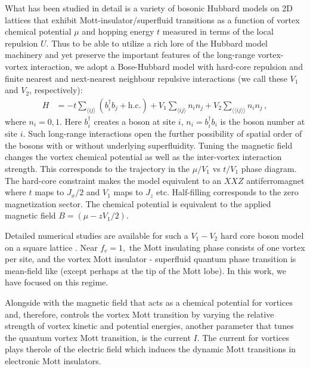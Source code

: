 \documentclass[aps,twocolumn,prl,10pt,amsmath,amssymb,nofootinbib,showpacs,superscriptaddress,floatfix]{revtex4-1}
\begin{document}
What has been studied in detail is a variety of bosonic Hubbard models on 2D lattices that exhibit Mott-insulator/superfluid
transitions as a function of vortex chemical potential $\mu$ and
hopping energy $t$ measured in terms of the local repulsion $U$.
Thus to be able to utilize a rich lore of the Hubbard model machinery and yet preserve the important features of the long-range vortex-vortex interaction, we adopt
a Bose-Hubbard model with hard-core repulsion
and finite nearest and next-nearest neighbour repulsive interactions
(we call these $V_{1}$ and $V_{2}$, respectively): 
\begin{align}
	H & =-t\sum_{\langle ij\rangle}(b_{i}^{\dagger}b_{j}+\text{h.c.})+V_{1}\sum_{\langle ij\rangle}n_{i}n_{j}+V_{2}\sum_{\langle\langle ij\rangle\rangle}n_{i}n_{j}\,, %
	\label{eq:model-hardcore}
\end{align}
where $n_{i}=0,1$.
Here $b_{i}^{\dagger}$ creates a boson at site $i$, $n_{i}=b_{i}^{\dagger}b_{i}$
is the boson number at site $i.$ Such long-range interactions open
the further possibility of spatial order of the bosons with or without
underlying superfluidity. Tuning the magnetic field changes the vortex
chemical potential as well as the inter-vortex interaction strength.
This corresponds to the trajectory in the $\mu/V_{1}$
vs $t/V_{1}$ phase diagram. The hard-core constraint makes the model
equivalent to an $XXZ$ antiferromagnet where $t$ maps to $J_{x}/2$
and $V_{1}$ maps to $J_{z}$ etc. Half-filling corresponds to the
zero magnetization sector. The chemical potential is equivalent to
the applied magnetic field $B=(\mu-zV_{1}/2)$. 

Detailed numerical studies are available for such a $V_{1}-V_{2}$
hard core boson model on a square lattice \cite{hebert}. Near $f_{c}=1,$
the Mott insulating phase consists of one vortex per site, and the
vortex Mott insulator - superfluid quantum phase transition is mean-field
like (except perhaps at the tip of the Mott lobe). In this work, we have
focused on this regime.

Alongside with the magnetic field that acts as a chemical potential for
vortices and, therefore, controls the vortex Mott transition by
varying the relative strength of vortex kinetic and potential energies,
another parameter that tunes the quantum vortex
Mott transition, is the current $I$. The current for vortices plays therole of the electric field which induces the dynamic
Mott transitions in electronic Mott insulators.
\end{document}
